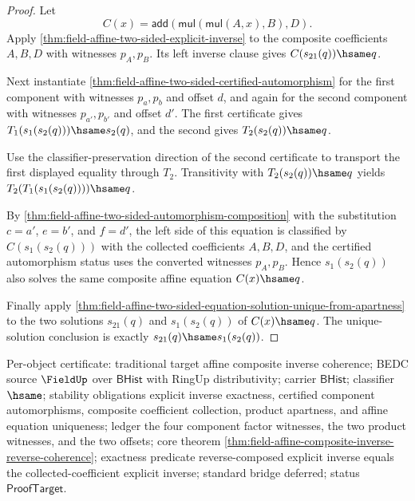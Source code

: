 \begin{proof}
Let
$$
C(x)=\mathsf{add}(\mathsf{mul}(\mathsf{mul}(A,x),B),D).
$$
Apply
\autoref{thm:field-affine-two-sided-explicit-inverse} to the composite
coefficients $A,B,D$ with witnesses $p_A,p_B$. Its left inverse clause gives
$C(s_{21}(q))\hsame q$.

Next instantiate
\autoref{thm:field-affine-two-sided-certified-automorphism} for the first
component with witnesses $p_a,p_b$ and offset $d$, and again for the second
component with witnesses $p_{a'},p_{b'}$ and offset $d'$. The first certificate
gives $T_1(s_1(s_2(q)))\hsame s_2(q)$, and the second gives
$T_2(s_2(q))\hsame q$.

Use the classifier-preservation direction of the second certificate to
transport the first displayed equality through $T_2$. Transitivity with
$T_2(s_2(q))\hsame q$ yields
$T_2(T_1(s_1(s_2(q))))\hsame q$.

By
\autoref{thm:field-affine-two-sided-automorphism-composition} with the
substitution $c=a'$, $e=b'$, and $f=d'$, the left side of this equation is
classified by $C(s_1(s_2(q)))$ with the collected coefficients $A,B,D$, and the
certified automorphism status uses the converted witnesses $p_A,p_B$. Hence
$s_1(s_2(q))$ also solves the same composite affine equation $C(x)\hsame q$.

Finally apply
\autoref{thm:field-affine-two-sided-equation-solution-unique-from-apartness}
to the two solutions $s_{21}(q)$ and $s_1(s_2(q))$ of $C(x)\hsame q$. The
unique-solution conclusion is exactly
$s_{21}(q)\hsame s_1(s_2(q))$.
\end{proof}

Per-object certificate: traditional target affine composite inverse coherence;
BEDC source $\FieldUp$ over $\mathsf{BHist}$ with RingUp distributivity; carrier
$\mathsf{BHist}$; classifier $\hsame$; stability obligations explicit inverse
exactness, certified component automorphisms, composite coefficient collection,
product apartness, and affine equation uniqueness; ledger the four component
factor witnesses, the two product witnesses, and the two offsets; core theorem
\autoref{thm:field-affine-composite-inverse-reverse-coherence}; exactness
predicate reverse-composed explicit inverse equals the collected-coefficient
explicit inverse; standard bridge deferred; status $\mathsf{ProofTarget}$.

